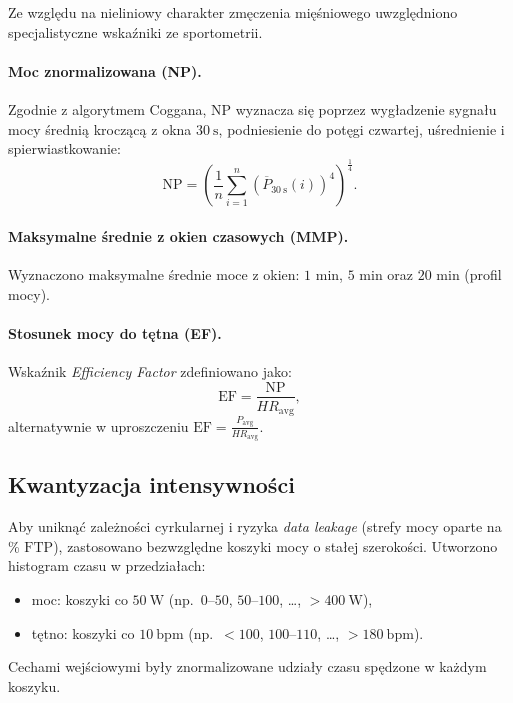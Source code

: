 Ze względu na nieliniowy charakter zmęczenia mięśniowego uwzględniono specjalistyczne wskaźniki ze sportometrii.

\paragraph{Moc znormalizowana (NP).}
Zgodnie z algorytmem Coggana, $\mathrm{NP}$ wyznacza się poprzez wygładzenie sygnału mocy średnią kroczącą z okna $30\ \mathrm{s}$, podniesienie do potęgi czwartej, uśrednienie i spierwiastkowanie:
\begin{equation}
\label{eq:np_definition}
\mathrm{NP} = \left(\frac{1}{n}\sum_{i=1}^{n} \left(\overline{P}_{30\ \mathrm{s}}(i)\right)^{4}\right)^{\frac{1}{4}}.
\end{equation}
\cite{allen2019power}

\paragraph{Maksymalne średnie z okien czasowych (MMP).}
Wyznaczono maksymalne średnie moce z okien: $1$ min, $5$ min oraz $20$ min (profil mocy).

\paragraph{Stosunek mocy do tętna (EF).}
Wskaźnik \textit{Efficiency Factor} zdefiniowano jako:
\begin{equation}
\label{eq:ef_definition}
\mathrm{EF} = \frac{\mathrm{NP}}{HR_{\mathrm{avg}}},
\end{equation}
alternatywnie w uproszczeniu $\mathrm{EF}=\frac{P_{\mathrm{avg}}}{HR_{\mathrm{avg}}}$.

\subsection{Kwantyzacja intensywności}

Aby uniknąć zależności cyrkularnej i ryzyka \textit{data leakage} (strefy mocy oparte na \% $\mathrm{FTP}$), zastosowano bezwzględne koszyki mocy o stałej szerokości.
Utworzono histogram czasu w przedziałach:
\begin{itemize}
  \item moc: koszyki co $50\ \mathrm{W}$ (np.\ $0$--$50$, $50$--$100$, \dots, $>400\ \mathrm{W}$),
  \item tętno: koszyki co $10\ \mathrm{bpm}$ (np.\ $<100$, $100$--$110$, \dots, $>180\ \mathrm{bpm}$).
\end{itemize}
Cechami wejściowymi były znormalizowane udziały czasu spędzone w każdym koszyku.

